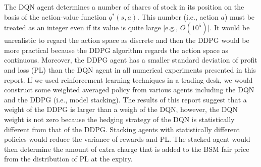 \documentclass[11pt]{article}
\begin{document}
The DQN agent determines a number of shares of stock in its position on the basis of the action-value function $q^\ast(s,a)$. This number (i.e.,  action $a$) must be treated as an integer even if its value is quite large [e.g., $O(10^5)$]. It would be unrealistic to regard the action space as discrete and then the DDPG would be more practical because the DDPG algorithm regards the action space as continuous. Moreover, the DDPG agent has a smaller standard deviation of profit and loss (PL) than the DQN agent in all numerical experiments presented in this report. If we used reinforcement learning techniques in a trading desk, we would construct some weighted averaged policy from various agents including the DQN and the DDPG (i.e., model stacking). The results of this report suggest that a weight of the DDPG is larger than a weigh of the DQN, however, the DQN weight is not zero because the hedging strategy of the DQN is statistically different from that of the DDPG.  Stacking agents with statistically different policies would reduce the variance of rewards and PL. The stacked agent would then determine the amount of extra charge that is added to the BSM fair price from the distribution of PL at the expiry.

\clearpage


\end{document}
